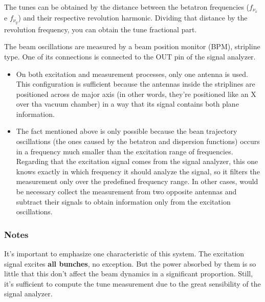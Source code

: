 The tunes can be obtained by the distance between the betatron frequencies ($f_{\nu_x}$ e $f_{\nu_y}$) and their respective revolution harmonic. Dividing that distance by the revolution frequency, you can obtain the tune fractional part.

The beam oscillations are measured by a beam position monitor (BPM), stripline type. One of its connections is connected to the OUT pin of the signal analyzer.

\begin{itemize}
	\item On both excitation and measurement processes, only one antenna is used. This configuration is sufficient because the antennas inside the striplines are positioned across de major axis (in other words, they're positioned like an X over tha vacuum chamber) in a way that its signal contains both plane information.
	\item The fact mentioned above is only possible because the bean trajectory oscillations (the ones caused by the betatron and dispersion functions) occurs in a frequency much smaller than the excitation range of frequencies. Regarding that the excitation signal comes from the signal analyzer, this one knows exactly in which frequency it should analyze the signal, so it filters the measurement only over the predefined frequency range. In other cases, would be necessary collect the measurement from two opposite antennas and subtract their signals to obtain information only from the excitation oscillations.
\end{itemize}

\subsubsection{Notes}
It's important to emphasize one characteristic of this system. The excitation signal excites \textbf{all bunches}, no exception. But the power absorbed by them is so little that this don't affect the beam dynamics in a significant proportion. Still, it's sufficient to compute the tune measurement due to the great sensibility of the signal analyzer.

\pagebreak